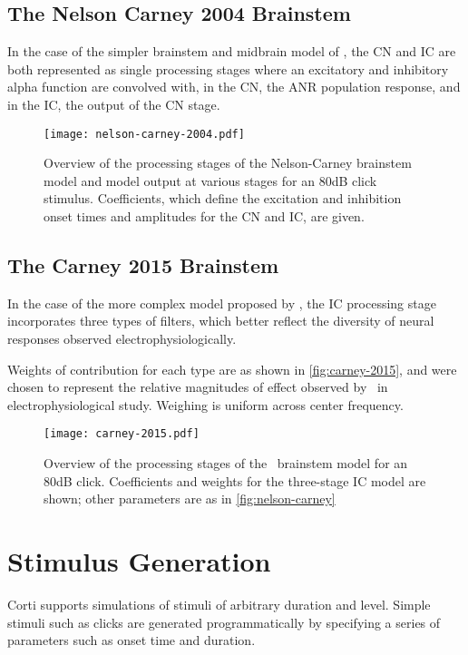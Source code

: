\subsection{The Nelson Carney 2004 Brainstem} %
In the case of the simpler brainstem and midbrain model of \cite{Nelson2004Phenomenological}, the CN and IC are both represented as single processing stages where an excitatory and inhibitory alpha function are convolved with, in the CN, the ANR population response, and in the IC, the output of the CN stage. 
\label{sub:the_nelson_carney_2004_brainstem}
\begin{figure}[htbp]
	\centering
	\texttt{[image: nelson-carney-2004.pdf]}
	\caption[Overview of the Nelson-Carney Midbrain and Brainstem]{Overview of the processing stages of the Nelson-Carney brainstem model and model output at various stages for an 80dB click stimulus. Coefficients, which define the excitation and inhibition onset times and amplitudes for the CN and IC, are given. }
	\label{fig:nelson-carney}
\end{figure}
\subsection{The Carney 2015 Brainstem} %
\label{sub:the_carney_2015_brainstem}
In the case of the more complex model proposed by \cite{Carney2015Speech}, the IC processing stage incorporates three types of filters, which better reflect the diversity of neural responses observed electrophysiologically. 

Weights of contribution for each type are as shown in \autoref{fig:carney-2015}, and were chosen to represent the relative magnitudes of effect observed by~\cite{Carney2015Speech} in electrophysiological study.  Weighing is uniform across center frequency.

\begin{figure}[htbp]
	\centering
	\texttt{[image: carney-2015.pdf]}
	\caption[Overview of the Carney Midbrain and Brainstem]{Overview of the processing stages of the~\cite{Carney2015Speech} brainstem model for an 80dB click.  Coefficients and weights for the three-stage IC model are shown; other parameters are as in \autoref{fig:nelson-carney}}
	\label{fig:carney-2015}
\end{figure}


\section{Stimulus Generation} %
\label{sec:stimulus_generation}
Corti supports simulations of stimuli of arbitrary duration and level.  Simple stimuli such as clicks are generated programmatically by specifying a series of parameters such as onset time and duration.  

